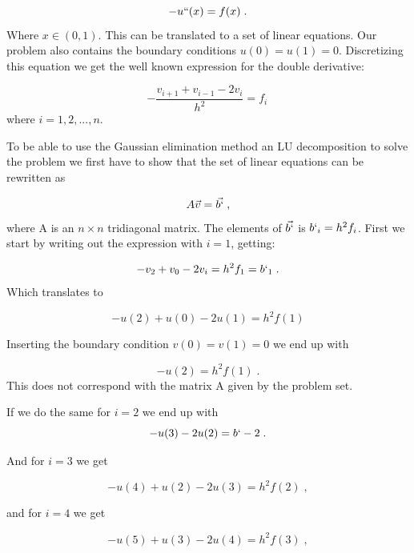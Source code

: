 \documentclass[english,a4paper, 11pt]{article}
\begin{document}
\begin{equation}
-u``(x) = f(x)\;.
\label{eq4}
\end{equation}
Where $x \in (0,1)$.
This can be translated to a set of linear equations. Our problem also contains the boundary conditions $u(0) = u(1) =0$. Discretizing this equation we get the well known expression for the double derivative:

\begin{equation}
-\frac{v_{i+1} + v_{i-1} - 2v_i}{h^2} = f_i \, 
\label{eq5}
\end{equation}
where $i = 1, 2,..., n$.

To be able to use the Gaussian elimination method an LU decomposition to solve the problem we first have to show that the set of linear equations can be rewritten as 

\begin{equation}
A\vec{v} = \vec{b`} \;,
\label{eq6}
\end{equation}
 where A is an $n \times n$ tridiagonal matrix. The elements of $\vec{b`}$ is $b`_i = h^2f_i$. First we start by writing out the expression with $i=1$, getting:
 
 \begin{equation}
 -v_2 + v_0 -2v_i = h^2f_1 = b`_1\;.
 \label{eq7}
 \end{equation}
 Which translates to
 
 \begin{equation}
 -u(2) + u(0) - 2u(1) = h^2f(1)
 \label{eq8}
 \end{equation}
 
Inserting the boundary condition $v(0)= v(1) = 0$ we end up with

\begin{equation}
-u(2) = h^2f(1)\;.
\label{eq9}
\end{equation}
This does not correspond with the matrix A given by the problem set.

 If we do the same for $i=2$ we end up with
 \begin{equation}
 -u(3) -2u(2) = b`-2\;.
 \label{eq10}
 \end{equation}
  
 And for $i = 3$  we get 
 
 \begin{equation}
 -u(4) + u(2) - 2u(3) = h^2f(2)\;,
 \label{eq11}
 \end{equation}
 
 and for $i = 4$ we get
 
 \begin{equation}
 -u(5) + u(3) -2u(4) = h^2f(3)\;,
 \label{eq12}
 \end{equation}
 
\end{document}
